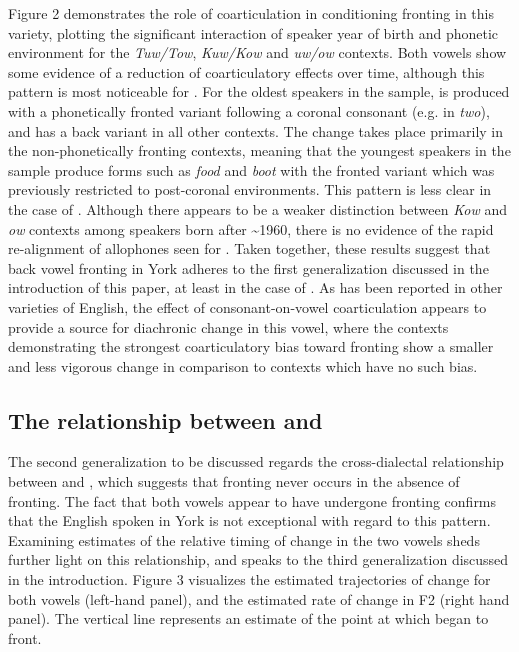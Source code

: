 \documentclass[12pt]{article}
\begin{document}
Figure 2 demonstrates the role of coarticulation in conditioning fronting in this variety, plotting the significant interaction of speaker year of birth and phonetic environment for the \textit{Tuw/Tow}, \textit{Kuw/Kow} and \textit{uw/ow} contexts. Both vowels show some evidence of a reduction of coarticulatory effects over time, although this pattern is most noticeable for . For the oldest speakers in the sample,  is produced with a phonetically fronted variant following a coronal consonant (e.g. in \textit{two}), and has a back variant in all other contexts. The change takes place primarily in the non-phonetically fronting contexts, meaning that the youngest speakers in the sample produce forms such as \textit{food} and \textit{boot} with the fronted variant which was previously restricted to post-coronal environments. This pattern is less clear in the case of . Although there appears to be a weaker distinction between \textit{Kow} and \textit{ow} contexts among speakers born after \textasciitilde1960, there is no evidence of the rapid re-alignment of allophones seen for . Taken together, these results suggest that back vowel fronting in York adheres to the first generalization discussed in the introduction of this paper, at least in the case of . As has been reported in other varieties of English, the effect of consonant-on-vowel coarticulation appears to provide a source for diachronic change in this vowel, where the contexts demonstrating the strongest coarticulatory bias toward fronting show a smaller and less vigorous change in comparison to contexts which have no such bias. 

\subsection{The relationship between  and }
The second generalization to be discussed regards the cross-dialectal relationship between  and , which suggests that  fronting never occurs in the absence of  fronting. The fact that both vowels appear to have undergone fronting confirms that the English spoken in York is not exceptional with regard to this pattern. Examining estimates of the relative timing of change in the two vowels sheds further light on this relationship, and speaks to the third generalization discussed in the introduction. Figure 3 visualizes the estimated trajectories of change for both vowels (left-hand panel), and the estimated rate of change in F2 (right hand panel). The vertical line represents an estimate of the point at which  began to front.
\end{document}
